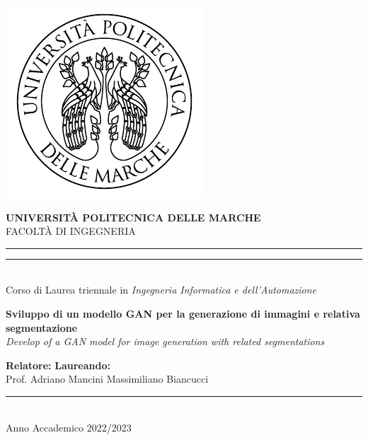 \begin{titlepage}

\begin{center}
\includegraphics[scale=0.85]{imgs/UnivpmLogo.pdf} \\
\vspace{5mm}

{{\Large{\textbf{\large{UNIVERSITÀ POLITECNICA DELLE MARCHE}}}}} \\
\vspace{3mm}
\small{FACOLTÀ DI INGEGNERIA}\\
\vspace{3.5mm}

\rule[0.1cm]{\textwidth}{0.1mm}
\rule[0.5cm]{\textwidth}{0.6mm} 
\\

\large{{Corso di Laurea triennale in \textit{Ingegneria Informatica e dell'Automazione}}} \\

\end{center}

\vspace{18mm}
\begin{center}
{\LARGE{\bf{Sviluppo di un modello GAN per la generazione di immagini e relativa segmentazione}}}\\
\vspace{6mm}
\Large{\textit{Develop of a GAN model for image generation with related segmentations}}\\
\vspace{15mm}
\end{center}

\vspace{20mm}


\noindent
\textbf{Relatore:}
\hfill
\textbf{Laureando:} \\
\noindent
Prof. Adriano Mancini 
\hfill
Massimiliano Biancucci \\
\noindent



\vfill
\begin{center}
\rule[0.1cm]{\textwidth}{0.1mm} \\
{\large{
Anno Accademico 2022/2023 }}
\end{center}
\end{titlepage}
\restoregeometry